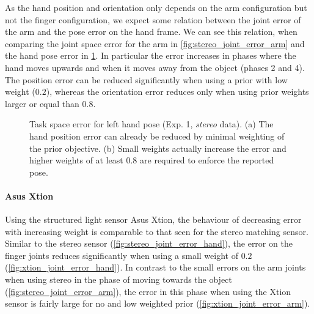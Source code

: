 As the hand position and orientation only depends on the arm configuration but not the finger configuration, we expect some relation between the joint error of the arm and the pose error on the hand frame. We can see this relation, when comparing the joint space error for the arm in \cref{fig:stereo_joint_error_arm} and the hand pose error in \cref{fig:stereo_hand_pose_error}. In particular the error increases in phases where the hand moves upwards and when it moves away from the object (phases 2 and 4). The position error can be reduced significantly when using a prior with low weight ($0.2$), whereas the orientation error reduces only when using prior weights larger or equal than $0.8$.

\begin{figure}[h]
\centering
{}
%
\caption{Task space error for left hand pose (Exp. 1, \textit{stereo} data). (a) The hand position error can already be reduced by minimal weighting of the prior objective. (b) Small weights actually increase the error and higher weights of at least $0.8$ are required to enforce the reported pose.}
\label{fig:stereo_hand_pose_error}
\end{figure}


\paragraph{Asus Xtion}

Using the structured light sensor Asus Xtion, the behaviour of decreasing error with increasing weight is comparable to that seen for the stereo matching sensor. Similar to the stereo sensor (\cref{fig:stereo_joint_error_hand}), the error on the finger joints reduces significantly when using a small weight of $0.2$ (\cref{fig:xtion_joint_error_hand}).
In contrast to the small errors on the arm joints when using stereo in the phase of moving towards the object (\cref{fig:stereo_joint_error_arm}), the error in this phase when using the Xtion sensor is fairly large for no and low weighted prior (\cref{fig:xtion_joint_error_arm}).

